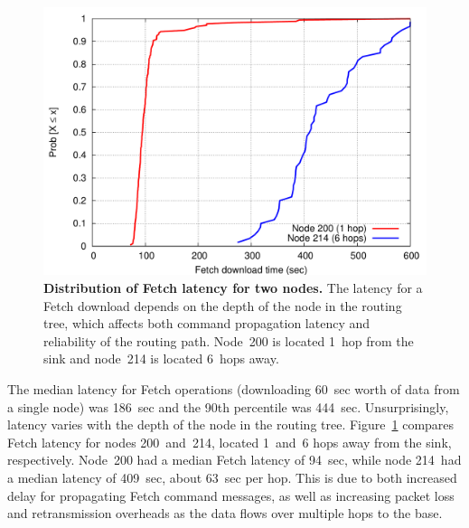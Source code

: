 \begin{figure}[t]
\label{evaluation-fig-fetchlatency-byhops}
\begin{center}
\includegraphics[width=\hsize]{./5-evaluation/figs/performance/CDFByHops/CDFBYHOPS.pdf}
\end{center}
\caption{\textbf{Distribution of Fetch latency for two nodes.}
The latency for a Fetch download depends on the depth of the node in the
routing tree, which affects both command propagation latency and reliability
of the routing path. Node~200 is located 1~hop from the sink and node~214 is
located 6~hops away.}
\end{figure}

The median latency for Fetch operations (downloading 60~sec worth of data
from a single node) was 186~sec and the 90th percentile was 444~sec.
Unsurprisingly, latency varies with the depth of the node in the routing
tree. Figure~\ref{evaluation-fig-fetchlatency-byhops} compares Fetch latency
for nodes 200~and~214, located 1~and~6 hops away from the sink, respectively.
Node~200 had a median Fetch latency of 94~sec, while node 214~had a median
latency of 409~sec, about 63~sec per hop.  This is due to both increased
delay for propagating Fetch command messages, as well as increasing packet
loss and retransmission overheads as the data flows over multiple hops to the
base.


